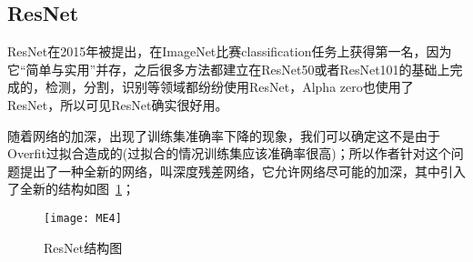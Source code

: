 \subsection{ResNet}
ResNet在2015年被提出，在ImageNet比赛classification任务上获得第一名，因为它“简单与实用”并存，之后很多方法都建立在ResNet50或者ResNet101的基础上完成的，检测，分割，识别等领域都纷纷使用ResNet，Alpha zero也使用了ResNet，所以可见ResNet确实很好用。

随着网络的加深，出现了训练集准确率下降的现象，我们可以确定这不是由于Overfit过拟合造成的(过拟合的情况训练集应该准确率很高)；所以作者针对这个问题提出了一种全新的网络，叫深度残差网络，它允许网络尽可能的加深，其中引入了全新的结构如图~\ref{fig5}；

\begin{figure}[!htbp]
    \centering
    \texttt{[image: ME4]}
    \caption{ResNet结构图}
    \label{fig5}
\end{figure}

